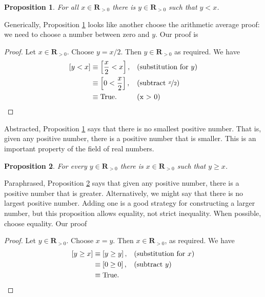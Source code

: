 \documentclass[12pt,fleqn]{article}
\newcommand{\reals}{\mathbf{R}}
\newcommand{\true}{\mathrm{True}}
\newenvironment{myproof}
  {\begin{shaded}\begin{proof}}
  {\end{proof}\end{shaded}}
\newtheorem{prop}{Proposition}
\begin{document}
    \begin{prop}   For all $x \in \reals_{>0}$ there is 
      $y \in \reals_{> 0}$ such that $y < x$.  \label{p3}
    \end{prop}
     
    \noindent Generically, Proposition \ref{p3} looks like another choose the arithmetic average proof: we need to choose a number between zero and $y$. Our proof is
      
      \begin{myproof}  Let $x \in \reals_{>0}$. Choose $y = x/2$. Then $y \in \reals_{>0}$ as required. We have
         \begin{align*}
         \left[y < x \right] &\equiv \left[\frac{x}{2} < x \right], &&\text{(substitution for $y$)} \\
                                   &\equiv \left[0 < \frac{x}{2}  \right], &&\text{(subtract $\nicefrac{x}{2}$)} \\
                                   &\equiv \true.  &&\text{(x > 0)} \qedhere
      \end{align*}
      \end{myproof}
\noindent Abstracted, Proposition \ref{p3} says that there is no smallest positive number. That is, given any positive number, there is a 
positive number that is smaller.  This is an important property of the field of real numbers.
       

       \begin{prop} For every $y \in \reals_{> 0}$ there is  
        $x \in \reals_{>0}$ such that $y \geq  x$. \label{p4}
      \end{prop}
      \noindent Paraphrased, Proposition \ref{p4} says that given any positive number, there is a positive number that is greater. Alternatively, we
      might say that there is no largest positive number. Adding one is a good strategy for constructing a larger number, but this proposition
      allows equality, not strict inequality.  When possible, choose equality. Our proof
      
       \begin{myproof} Let $y \in \reals_{>0}$. Choose $x = y$. Then $x \in \reals_{>0}$, as 
        required. We have
       \begin{align*}
         \left[y \geq x  \right] &\equiv \left[y \geq  y \right], && \text{(substitution for $x$)} \\
                                      &\equiv \left[0 \geq 0 \right], &&\text{(subtract $y$)} \\
                                      &\equiv \true. && \qedhere
       \end{align*}
       
       \end{myproof}
\end{document}
